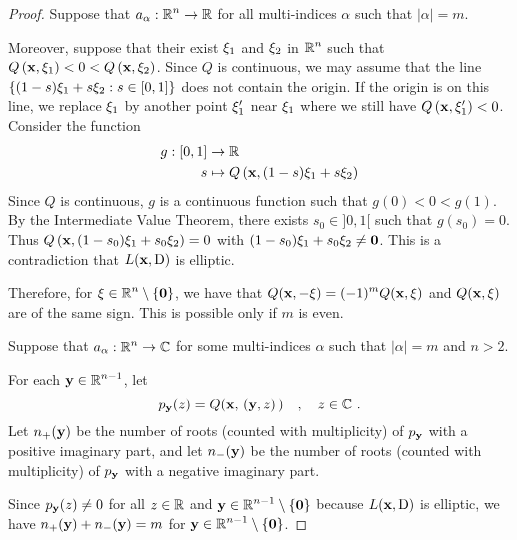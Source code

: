 \begin{proof}
 Suppose that $\displaystyle a_\alpha:\mathbb{R}^n\rightarrow \mathbb{R}$ for all
multi-indices $\alpha$ such that $|\alpha|=m$.

Moreover, suppose that their exist $\mathbf{\xi}_1$ and $\mathbf{\xi}_2$ in
$\displaystyle \mathbb{R}^n$ such that
$\displaystyle Q\left(\mathbf{x}, \mathbf{\xi}_1\right) < 0 <
Q\left(\mathbf{x}, \mathbf{\xi}_2\right)$.  Since $Q$ is continuous, we may
assume that the line
$\displaystyle \left\{ (1-s)\mathbf{\xi}_1 + s\mathbf{\xi}_2 : s \in [0,1] \right\}$
does not contain the origin.  If the origin is on this line, we
replace $\mathbf{\xi}_1$ by another point $\mathbf{\xi}_1'$ near
$\mathbf{\xi}_1$ where we still have
$Q\left(\mathbf{x}, \mathbf{\xi}_1'\right) < 0$.  Consider the function
\begin{align*}
g:[0,1] &\rightarrow \mathbb{R} \\
s &\mapsto Q\left(\mathbf{x}, (1-s)\mathbf{\xi}_1 + s\mathbf{\xi}_2\right)
\end{align*}
Since $Q$ is continuous, $g$ is a continuous function such that
$g(0)<0<g(1)$.  By the Intermediate Value Theorem, there exists
$s_0 \in ]0,1[$ such that $g(s_0)=0$.  Thus
$\displaystyle
Q\left(\mathbf{x}, (1-s_0)\mathbf{\xi}_1 + s_0\mathbf{\xi}_2\right) = 0$
with $\displaystyle (1-s_0)\mathbf{\xi}_1 + s_0\mathbf{\xi}_2 \neq \mathbf{0}$.
This is a contradiction that $L(\mathbf{x}, \operatorname{D})$ is elliptic.

Therefore, for
$\displaystyle \mathbf{\xi} \in \mathbb{R}^n \setminus \{\mathbf{0}\}$, we have
that $\displaystyle Q(\mathbf{x}, -\mathbf{\xi}) = (-1)^mQ(\mathbf{x}, \mathbf{\xi})$
and $\displaystyle Q(\mathbf{x}, \mathbf{\xi})$ are of the same sign.  This
is possible only if $m$ is even.

 Suppose that $\displaystyle a_\alpha:\mathbb{R}^n\rightarrow \mathbb{C}$ for some
multi-indices $\alpha$ such that $|\alpha|=m$ and $n>2$.

For each $\displaystyle \mathbf{y} \in \mathbb{R}^{n-1}$, let
\[
p_{\mathbf{y}}(z) = Q(\mathbf{x}, \,(\mathbf{y},z)\,) \quad , \quad z \in \mathbb{C} \ .
\]
Let $n_+(\mathbf{y})$ be the number of roots (counted with multiplicity)
of $p_{\mathbf{y}}$ with a positive imaginary part, and let $n_-(\mathbf{y})$ be
the number of roots (counted with multiplicity) of $p_{\mathbf{y}}$ with
a negative imaginary part.

Since $p_{\mathbf{y}}(z) \neq 0$ for all $z\in \mathbb{R}$ and
$\displaystyle \mathbf{y} \in \mathbb{R}^{n-1}\setminus \{\mathbf{0}\}$ because
$L(\mathbf{x},\operatorname{D})$ is elliptic, we have $n_+(\mathbf{y})+n_-(\mathbf{y})=m$
for $\displaystyle \mathbf{y} \in \mathbb{R}^{n-1}\setminus \{\mathbf{0}\}$.


\end{proof}
